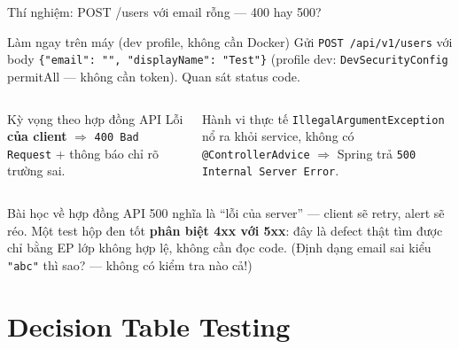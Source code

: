 \documentclass[aspectratio=169,12pt]{beamer}
\begin{document}
\begin{frame}[shrink=10]{Thí nghiệm: POST /users với email rỗng --- 400 hay 500?}
  \begin{exampleblock}{Làm ngay trên máy (dev profile, không cần Docker)}
    \small
    Gửi \texttt{POST /api/v1/users} với body
    \texttt{\{"email": "", "displayName": "Test"\}}
    (profile dev: \texttt{DevSecurityConfig} permitAll --- không cần token).
    Quan sát status code.
  \end{exampleblock}

  \vspace{0.3em}
  \begin{columns}[T]
    \begin{block}{Kỳ vọng theo hợp đồng API}
      Lỗi \textbf{của client} $\Rightarrow$ \texttt{400 Bad Request}
      + thông báo chỉ rõ trường sai.
    \end{block}
    \begin{alertblock}{Hành vi thực tế}
      \texttt{IllegalArgumentException} nổ ra khỏi service, không có
      \texttt{@ControllerAdvice} $\Rightarrow$ Spring trả
      \texttt{500 Internal Server Error}.
    \end{alertblock}
  \end{columns}

  \vspace{0.3em}
  \begin{block}{Bài học về hợp đồng API}
    \small 500 nghĩa là ``lỗi của server'' --- client sẽ retry, alert sẽ réo.
    Một test hộp đen tốt \textbf{phân biệt 4xx với 5xx}: đây là defect thật
    tìm được chỉ bằng EP lớp không hợp lệ, không cần đọc code.
    (Định dạng email sai kiểu \texttt{"abc"} thì sao? --- không có kiểm tra nào cả!)
  \end{block}
\end{frame}

\section{Decision Table Testing}
\end{document}
